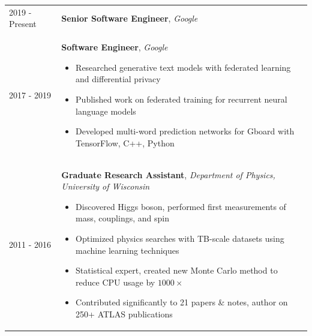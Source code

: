 \documentclass{letter}
\begin{document}
\begin{tabular}{p{}p{}}
        2019 - Present
        &
        \textbf{Senior Software Engineer}, \textit{Google} \\
        2017 - 2019
        &
        \textbf{Software Engineer}, \textit{Google} \newline
	\vspace{-15pt}      %
        \begin{itemize}
		\itemsep0em
		\renewcommand{\labelitemi}{\tiny$\blacksquare$}
                \item Researched generative text models with federated learning and differential privacy
                \item Published work on federated training for recurrent neural language models
    		\item Developed multi-word prediction networks for Gboard with TensorFlow, C++, Python
        \end{itemize}
\\
	2011 - 2016
	&
	\textbf{Graduate Research Assistant}, \textit{Department of Physics, University of Wisconsin} \newline
	\vspace{-15pt}      %
	\begin{itemize}
		\itemsep0em
		\renewcommand{\labelitemi}{\tiny$\blacksquare$}
    		\item Discovered Higgs boson, performed first measurements of mass, couplings, and spin 
		\item Optimized physics searches with TB-scale datasets using machine learning techniques
    		\item Statistical expert, created new Monte Carlo method to reduce CPU usage by $1000\times$
		\item Contributed significantly to 21 papers \& notes, author on 250+ ATLAS publications
	\end{itemize}
\\

\end{tabular}
\end{document}
